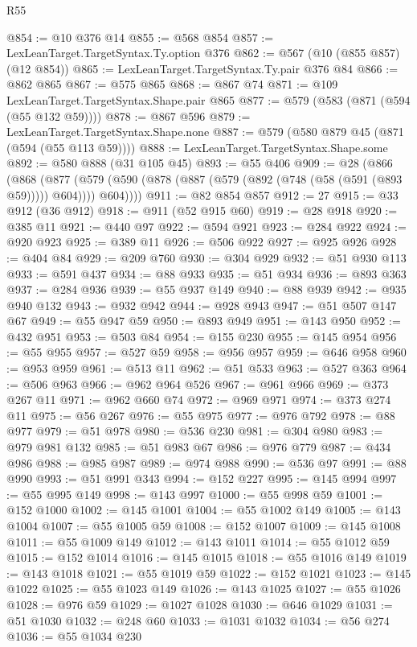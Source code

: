 \begin{lexlean}{R55}
\begin{coremodule}
@854 := @10 @376 @14
@855 := @568 @854
@857 := LexLeanTarget.TargetSyntax.Ty.option @376
@862 := @567 (@10 (@855 @857) (@12 @854))
@865 := LexLeanTarget.TargetSyntax.Ty.pair @376 @84
@866 := @862 @865
@867 := @575 @865
@868 := @867 @74
@871 := @109 LexLeanTarget.TargetSyntax.Shape.pair @865
@877 := @579 (@583 (@871 (@594 (@55 @132 @59))))
@878 := @867 @596
@879 := LexLeanTarget.TargetSyntax.Shape.none
@887 := @579 (@580 @879 @45 (@871 (@594 (@55 @113 @59))))
@888 := LexLeanTarget.TargetSyntax.Shape.some
@892 := @580 @888 (@31 @105 @45)
@893 := @55 @406
@909 := @28
    (@866
      (@868
        (@877 (@579 (@590 (@878 (@887 (@579 (@892 (@748 (@58 (@591 (@893 @59))))) @604)))) @604))))
@911 := @82 @854 @857
@912 := 27
@915 := @33 @912 (@36 @912)
@918 := @911 (@52 @915 @60)
@919 := @28 @918
@920 := @385 @11
@921 := @440 @97
@922 := @594 @921
@923 := @284 @922
@924 := @920 @923
@925 := @389 @11
@926 := @506 @922
@927 := @925 @926
@928 := @404 @84
@929 := @209 @760
@930 := @304 @929
@932 := @51 @930 @113
@933 := @591 @437
@934 := @88 @933
@935 := @51 @934
@936 := @893 @363
@937 := @284 @936
@939 := @55 @937 @149
@940 := @88 @939
@942 := @935 @940 @132
@943 := @932 @942
@944 := @928 @943
@947 := @51 @507 @147 @67
@949 := @55 @947 @59
@950 := @893 @949
@951 := @143 @950
@952 := @432 @951
@953 := @503 @84
@954 := @155 @230
@955 := @145 @954
@956 := @55 @955
@957 := @527 @59
@958 := @956 @957
@959 := @646 @958
@960 := @953 @959
@961 := @513 @11
@962 := @51 @533
@963 := @527 @363
@964 := @506 @963
@966 := @962 @964 @526
@967 := @961 @966
@969 := @373 @267 @11
@971 := @962 @660 @74
@972 := @969 @971
@974 := @373 @274 @11
@975 := @56 @267
@976 := @55 @975
@977 := @976 @792
@978 := @88 @977
@979 := @51 @978
@980 := @536 @230
@981 := @304 @980
@983 := @979 @981 @132
@985 := @51 @983 @67
@986 := @976 @779
@987 := @434 @986
@988 := @985 @987
@989 := @974 @988
@990 := @536 @97
@991 := @88 @990
@993 := @51 @991 @343
@994 := @152 @227
@995 := @145 @994
@997 := @55 @995 @149
@998 := @143 @997
@1000 := @55 @998 @59
@1001 := @152 @1000
@1002 := @145 @1001
@1004 := @55 @1002 @149
@1005 := @143 @1004
@1007 := @55 @1005 @59
@1008 := @152 @1007
@1009 := @145 @1008
@1011 := @55 @1009 @149
@1012 := @143 @1011
@1014 := @55 @1012 @59
@1015 := @152 @1014
@1016 := @145 @1015
@1018 := @55 @1016 @149
@1019 := @143 @1018
@1021 := @55 @1019 @59
@1022 := @152 @1021
@1023 := @145 @1022
@1025 := @55 @1023 @149
@1026 := @143 @1025
@1027 := @55 @1026
@1028 := @976 @59
@1029 := @1027 @1028
@1030 := @646 @1029
@1031 := @51 @1030
@1032 := @248 @60
@1033 := @1031 @1032
@1034 := @56 @274
@1036 := @55 @1034 @230

\end{coremodule}
\end{lexlean}
